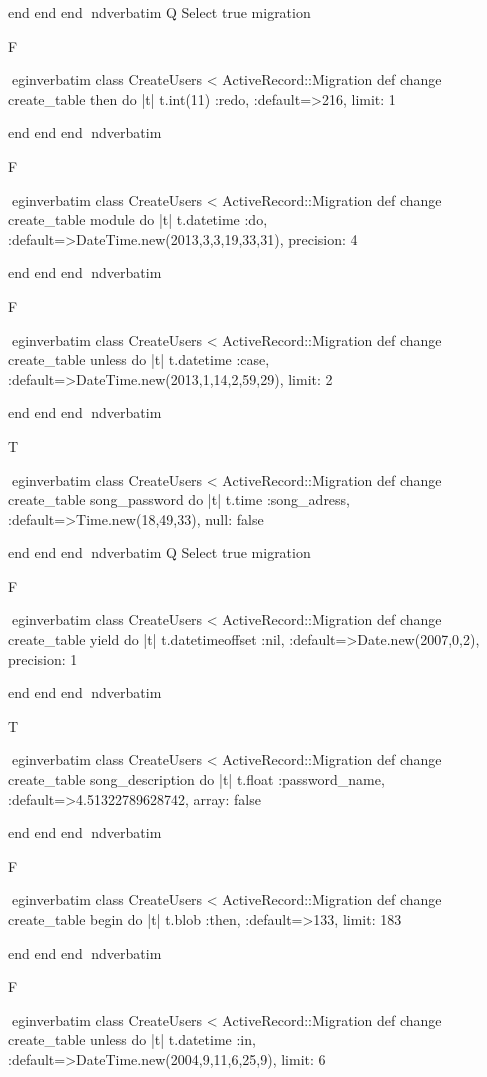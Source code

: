     end 
  end 
end
nd{verbatim}
Q
 Select true migration

F

egin{verbatim}
 class CreateUsers < ActiveRecord::Migration 
  def change 
    create_table then do |t| 
      t.int(11) :redo, :default=>216, limit: 1
    
    end 
  end 
end
nd{verbatim}

F

egin{verbatim}
 class CreateUsers < ActiveRecord::Migration 
  def change 
    create_table module do |t| 
      t.datetime :do, :default=>DateTime.new(2013,3,3,19,33,31), precision: 4
    
    end 
  end 
end
nd{verbatim}

F

egin{verbatim}
 class CreateUsers < ActiveRecord::Migration 
  def change 
    create_table unless do |t| 
      t.datetime :case, :default=>DateTime.new(2013,1,14,2,59,29), limit: 2
    
    end 
  end 
end
nd{verbatim}

T

egin{verbatim}
 class CreateUsers < ActiveRecord::Migration 
  def change 
    create_table song_password do |t| 
      t.time :song_adress, :default=>Time.new(18,49,33), null: false
    
    end 
  end 
end
nd{verbatim}
Q
 Select true migration

F

egin{verbatim}
 class CreateUsers < ActiveRecord::Migration 
  def change 
    create_table yield do |t| 
      t.datetimeoffset :nil, :default=>Date.new(2007,0,2), precision: 1
    
    end 
  end 
end
nd{verbatim}

T

egin{verbatim}
 class CreateUsers < ActiveRecord::Migration 
  def change 
    create_table song_description do |t| 
      t.float :password_name, :default=>4.51322789628742, array: false
    
    end 
  end 
end
nd{verbatim}

F

egin{verbatim}
 class CreateUsers < ActiveRecord::Migration 
  def change 
    create_table begin do |t| 
      t.blob :then, :default=>133, limit: 183
    
    end 
  end 
end
nd{verbatim}

F

egin{verbatim}
 class CreateUsers < ActiveRecord::Migration 
  def change 
    create_table unless do |t| 
      t.datetime :in, :default=>DateTime.new(2004,9,11,6,25,9), limit: 6
    

